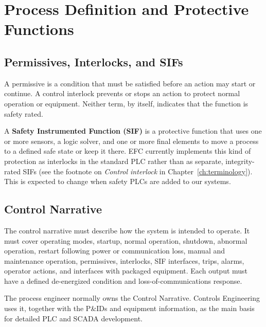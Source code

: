 \chapter{Process Definition and Protective Functions}
\section{Permissives, Interlocks, and SIFs}\label{sec:permissives-interlocks}
A permissive is a condition that must be satisfied before an action may start or continue. A control interlock prevents or stops an action to protect normal operation or equipment. Neither term, by itself, indicates that the function is safety rated.

A \textbf{Safety Instrumented Function (SIF)} is a protective function that uses one or more sensors, a logic solver, and one or more final elements to move a process to a defined safe state or keep it there. EFC currently implements this kind of protection as interlocks in the standard PLC rather than as separate, integrity-rated SIFs (see the footnote on \emph{Control interlock} in Chapter~\ref{ch:terminology}). This is expected to change when safety PLCs are added to our systems.

\section{Control Narrative}
The control narrative must describe how the system is intended to operate. It must cover operating modes, startup, normal operation, shutdown, abnormal operation, restart following power or communication loss, manual and maintenance operation, permissives, interlocks, SIF interfaces, trips, alarms, operator actions, and interfaces with packaged equipment. Each output must have a defined de-energized condition and loss-of-communications response.

The process engineer normally owns the Control Narrative. Controls Engineering uses it, together with the P\&IDs and equipment information, as the main basis for detailed PLC and SCADA development.

